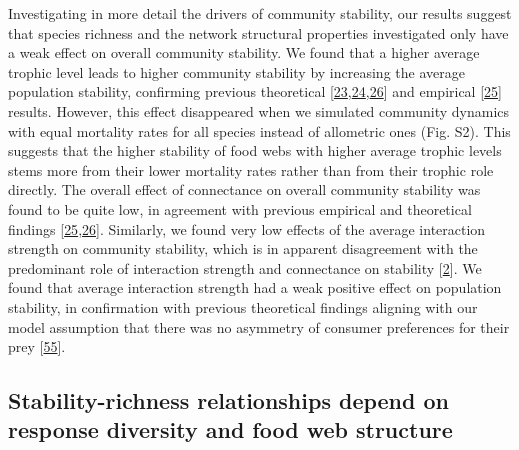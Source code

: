 \documentclass[
]{article}
\begin{document}
Investigating in more detail the drivers of community stability, our results
suggest that species richness and the network structural properties
investigated only have a weak effect on overall community stability. We found
that a higher average trophic level leads to higher community stability by
increasing the average population stability, confirming previous theoretical
{[}\protect\hyperlink{ref-brose_allometric_2006}{23},\protect\hyperlink{ref-shanafelt_stability_2018}{24},\protect\hyperlink{ref-eschenbrenner_diversity_2023}{26}{]} and empirical {[}\protect\hyperlink{ref-danet_species_2021}{25}{]} results. However,
this effect disappeared when we simulated community dynamics with equal
mortality rates for all species instead of allometric ones (Fig. S2). This
suggests that the higher stability of food webs with higher average trophic
levels stems more from their lower mortality rates rather than from their
trophic role directly. The overall effect of connectance on overall community
stability was found to be quite low, in agreement with previous empirical and
theoretical findings {[}\protect\hyperlink{ref-danet_species_2021}{25},\protect\hyperlink{ref-eschenbrenner_diversity_2023}{26}{]}.
Similarly, we found very low effects of the average interaction strength on
community stability, which is in apparent disagreement with the predominant
role of interaction strength and connectance on stability {[}\protect\hyperlink{ref-may_will_1972}{2}{]}. We
found that average interaction strength had a weak positive effect on
population stability, in confirmation with previous theoretical findings
aligning with our model assumption that there was no asymmetry of consumer
preferences for their prey {[}\protect\hyperlink{ref-gellner_consistent_2016}{55}{]}.

\hypertarget{stability-richness-relationships-depend-on-response-diversity-and-food-web-structure}{%
\subsection{Stability-richness relationships depend on response diversity and food web structure}\label{stability-richness-relationships-depend-on-response-diversity-and-food-web-structure}}
\end{document}
